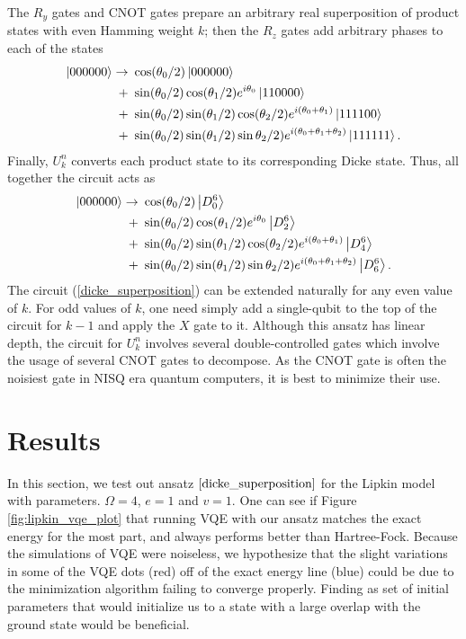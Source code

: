 \documentclass[10pt]{article}
\begin{document}
The $R_y$ gates and CNOT gates prepare an arbitrary real superposition of product states with even Hamming weight $k$; then the $R_z$ gates add arbitrary phases to each of the states
\begin{align}
\ket{000000}
\to \ &\cos(\theta_0/2)\ket{000000} 
\nonumber
\\
+\ &\sin(\theta_0/2)\cos(\theta_1/2)e^{i\theta_0}\ket{110000} 
\nonumber
\\
+\ &\sin(\theta_0/2)\sin(\theta_1/2)\cos(\theta_2/2)e^{i(\theta_0+\theta_1)}\ket{111100}
\nonumber
\\
+\ &\sin(\theta_0/2)\sin(\theta_1/2)\sin\theta_2/2)e^{i(\theta_0+\theta_1+\theta_2)}\ket{111111}.
\end{align}
Finally, $U^n_k$ converts each product state to its corresponding Dicke state. Thus, all together the circuit acts as
\begin{align}
\ket{000000}
\to \ &\cos(\theta_0/2)\ket{D^6_0} 
\nonumber
\\
+\ &\sin(\theta_0/2)\cos(\theta_1/2)e^{i\theta_0}\ket{D^6_2} 
\nonumber
\\
+\ &\sin(\theta_0/2)\sin(\theta_1/2)\cos(\theta_2/2)e^{i(\theta_0+\theta_1)}\ket{D^6_4}
\nonumber
\\
+\ &\sin(\theta_0/2)\sin(\theta_1/2)\sin\theta_2/2)e^{i(\theta_0+\theta_1+\theta_2)}\ket{D^6_6}.
\end{align}
The circuit (\ref{dicke_superposition}) can be extended naturally for any even value of $k$. For odd values of $k$, one need simply add a single-qubit to the top of the circuit for $k-1$ and apply the $X$ gate to it. Although this ansatz has linear depth, the circuit for $U^n_k$ involves several double-controlled gates which involve the usage of several CNOT gates to decompose. As the CNOT gate is often the noisiest gate in NISQ era quantum computers, it is best to minimize their use.

\section{Results}

In this section, we test out ansatz $\ref{dicke_superposition}$ for the Lipkin model with parameters. $\Omega =4$, $e=1$ and $v=1$. One can see if Figure \ref{fig:lipkin_vqe_plot} that running VQE with our ansatz matches the exact energy for the most part, and always performs better than Hartree-Fock. Because the simulations of VQE were noiseless, we hypothesize that the slight variations in some of the VQE dots (red) off of the exact energy line (blue) could be due to the minimization algorithm failing to converge properly. Finding as set of initial parameters that would initialize us to a state with a large overlap with the ground state would be beneficial.
\end{document}

